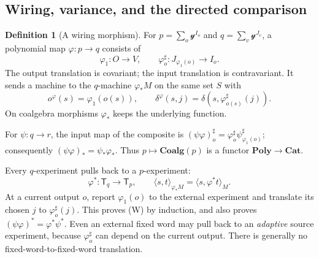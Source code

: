 \documentclass[11pt]{article}
\theoremstyle{definition}
\newtheorem{definition}[theorem]{Definition}
\theoremstyle{remark}\newtheorem{remark}[theorem]{Remark}
\newcommand{\Coalg}{\mathbf{Coalg}}
\newcommand{\Poly}{\mathbf{Poly}}
\newcommand{\Tests}{\mathsf T}
\begin{document}
\subsection{Wiring, variance, and the directed comparison}\label{p:sec:wiring}
\begin{definition}[A wiring morphism]
For $p=\sum_o\mathcal y^{I_o}$ and $q=\sum_v\mathcal y^{J_v}$, a polynomial
map $\varphi:p\to q$ consists of
\[
 \varphi_1:O\to V,
 \qquad \varphi_o^\sharp:J_{\varphi_1(o)}\to I_o.
\]
The output translation is covariant; the input translation is contravariant.
It sends a machine to the $q$-machine $\varphi_*M$ on the same set $S$ with
\[
 o^{\varphi}(s)=\varphi_1(o(s)),\qquad
 \delta^{\varphi}(s,j)=\delta(s,\varphi_{o(s)}^\sharp(j)).
\]
On coalgebra morphisms $\varphi_*$ keeps the underlying function.
\end{definition}
For $\psi:q\to r$, the input map of the composite is
$(\psi\varphi)_o^\sharp
=\varphi_o^\sharp\psi_{\varphi_1(o)}^\sharp$; consequently
$(\psi\varphi)_*=\psi_*\varphi_*$. Thus $p\mapsto\Coalg(p)$ is a functor
$\Poly\to\mathbf{Cat}$.

Every $q$-experiment pulls back to a $p$-experiment:
\[
 \varphi^*:\Tests_q\longrightarrow\Tests_p,
 \qquad
 \langle s,t\rangle_{\varphi_*M}
 =\langle s,\varphi^*t\rangle_M.                         \tag{W}
\]
At a current output $o$, report $\varphi_1(o)$ to the external experiment
and translate its chosen $j$ to $\varphi_o^\sharp(j)$. This proves (W) by
induction, and also proves
$(\psi\varphi)^*=\varphi^*\psi^*$.
Even an external fixed word may pull back to an \emph{adaptive} source
experiment, because $\varphi_o^\sharp$ can depend on the current output.
There is generally no fixed-word-to-fixed-word translation.
\end{document}
